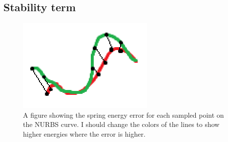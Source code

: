 \documentclass[sigconf]{acmart}
\begin{document}
\subsection{Stability term}
\begin{figure}[h]
  \centering
  \includegraphics[width=\linewidth]{figures/error_energy}
  \caption{A figure showing the spring energy error for each sampled point on the NURBS curve. I should change the colors of the lines to show higher energies where the error is higher.}
\end{figure}
\end{document}
